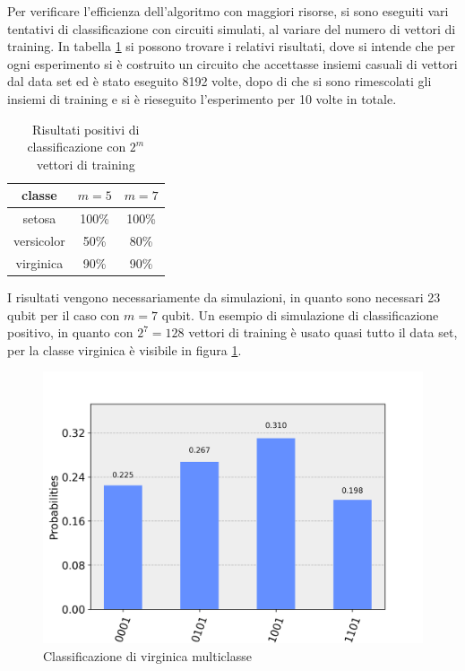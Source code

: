 Per verificare l'efficienza dell'algoritmo con maggiori risorse, si sono eseguiti 
vari tentativi di classificazione con circuiti simulati, al variare del numero di 
vettori di training. In tabella \ref{table:misure} si possono trovare i relativi 
risultati, dove si intende che per ogni esperimento si è costruito un circuito 
che accettasse insiemi casuali di vettori dal data set ed è stato eseguito 8192 
volte, dopo di che si sono rimescolati gli insiemi di training e si è rieseguito 
l'esperimento per 10 volte in totale. 

\begin{table}[h!]
    \centering
    \begin{tabular}{c c c}
        classe & $m=5$ & $m=7$ \\ 
        \hline
        setosa & 100\% & 100\%\\ 
        versicolor & 50\% & 80\%\\ 
        virginica & 90\% & 90\%
    \end{tabular}
    \caption{Risultati positivi di classificazione con $2^m$ vettori di training}
    \label{table:misure}
\end{table}

I risultati vengono necessariamente da simulazioni, in quanto sono necessari 
23 qubit per il caso con $m=7$ qubit. Un esempio di simulazione di classificazione 
positivo, in quanto con $2^7=128$ vettori di training è usato quasi tutto il data set, 
per la classe virginica è visibile in figura \ref{fig:multiclasse}. 

\begin{figure}[h!]
    \centering
    \includegraphics[width=\linewidth]{gfx/multiclass_virginica}
    \caption{Classificazione di virginica multiclasse}
    \label{fig:multiclasse}
\end{figure}


